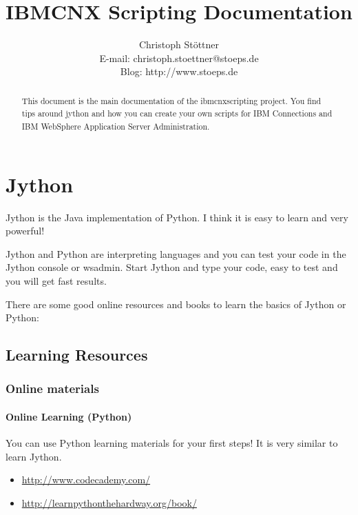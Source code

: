 \documentclass[12pt,a4paper]{article}
\title{IBMCNX Scripting Documentation}
\author
{Christoph Stöttner\\
\normalsize{E-mail:  christoph.stoettner@stoeps.de}\\
\normalsize{Blog: http://www.stoeps.de}
}
\date{}
\begin{document}
 


\maketitle 

\begin{abstract}
    This document is the main documentation of the ibmcnxscripting project. You find tips around jython and how you can create your own scripts for IBM\textsuperscript{\textregistered} Connections and IBM\textsuperscript{\textregistered} WebSphere\textsuperscript{\textregistered} Application Server Administration.
\end{abstract}

\newpage
\tableofcontents
\newpage
{}

\section{Jython}

Jython is the Java implementation of Python. I think it is easy to learn and very powerful! 

Jython and Python are interpreting languages and you can test your code in the Jython console or wsadmin. Start Jython and type your code, easy to test and you will get fast results.

There are some good online resources and books to learn the basics of Jython or Python:

\subsection{Learning Resources}

\subsubsection{Online materials}

\paragraph{Online Learning (Python)}

You can use Python learning materials for your first steps! It is very similar to learn Jython.

\begin{itemize}
	\item \url{ http://www.codecademy.com/}
	\item \url{http://learnpythonthehardway.org/book/}
\end{itemize}
\end{document}
